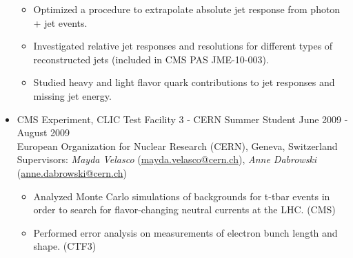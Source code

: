 \begin{itemize}[leftmargin=12pt]
\begin{itemize}
\item Optimized a procedure to extrapolate absolute jet response from photon + jet events.
\item Investigated relative jet responses and resolutions for different types of reconstructed jets (included in CMS PAS JME-10-003).
\item Studied heavy and light flavor quark contributions to jet responses and missing jet energy.
\end{itemize}
\item CMS Experiment, CLIC Test Facility 3 - CERN Summer Student \hfill June 2009 - August 2009\\
European Organization for Nuclear Research (CERN), Geneva, Switzerland\\
Supervisors: {\sl Mayda Velasco} (\href{mailto:mayda.velasco@cern.ch}{mayda.velasco@cern.ch}), {\sl Anne Dabrowski} (\href{mailto:anne.dabrowski@cern.ch}{anne.dabrowski@cern.ch})
\begin{itemize}
\item Analyzed Monte Carlo simulations of backgrounds for t-tbar events in order to search for flavor-changing neutral currents at the LHC. (CMS)
\item Performed error analysis on measurements of electron bunch length and shape. (CTF3)
\end{itemize}
\end{itemize}
